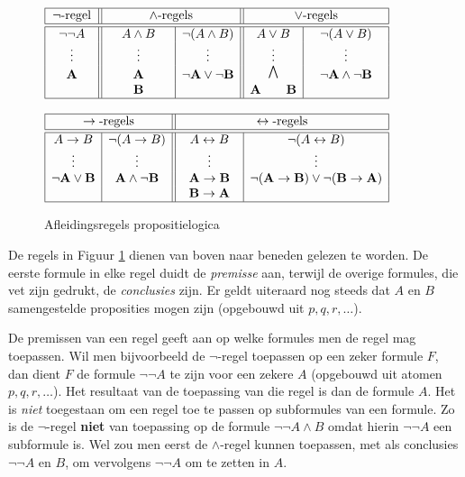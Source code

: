 \begin{figure}[ht]
$\begin{array}{|c||c|c||c|c|}
\hline
\neg\text{-regel} & \multicolumn{2}{c||}{\land\text{-regels}} & \multicolumn{2}{c|}{\lor\text{-regels}} \\
\hline\hline
\neg\neg A & A\land B & \neg(A\land B) & A\lor B & \neg(A\lor B) \\
\vdots & \vdots & \vdots & \vdots & \vdots \\
\mathbf{A} & \mathbf{A} & \mathbf{\neg A\lor\neg B} & \text{\huge $\mathbf{\bigwedge}$} & \mathbf{\neg A\land\neg B} \\
 & \mathbf{B} & & \mathbf{A\qquad B} & \\
 \hline
 \multicolumn{5}{c}{}\\
 \hline
 \multicolumn{2}{|c||}{\rightarrow\text{-regels}} & \multicolumn{3}{c|}{\leftrightarrow\text{-regels}} \\
 \hline\hline
 \multicolumn{1}{|c|}{ A\rightarrow B} & \multicolumn{1}{c||}{\neg(A\rightarrow B)} & \multicolumn{1}{c|}{A\leftrightarrow B} & \multicolumn{2}{c|}{\neg(A\leftrightarrow B)} \\
 \multicolumn{1}{|c|}{\vdots} & \multicolumn{1}{c||}{\vdots} & \multicolumn{1}{c|}{\vdots} & \multicolumn{2}{c|}{\vdots} \\
 \multicolumn{1}{|c|}{\mathbf{\neg A\lor B}} & \multicolumn{1}{c||}{\mathbf{A\land\neg B}} & \multicolumn{1}{c|}{\mathbf{A\rightarrow B}} & \multicolumn{2}{c|}{\mathbf{\neg(A\rightarrow B)\lor\neg(B\rightarrow A)}} \\
 \multicolumn{1}{|c|}{} & \multicolumn{1}{c||}{} & \multicolumn{1}{c|}{\mathbf{B\rightarrow A}} & \multicolumn{2}{c|}{} \\
 \hline
\end{array}$
\caption{Afleidings\-regels propositie\-logica}\label{fig:regels}
\end{figure}

De regels in Figuur \ref{fig:regels} dienen van boven naar beneden gelezen te worden. De eerste formule in elke regel duidt de \textit{premisse} aan, terwijl de overige formules, die vet zijn gedrukt, de \textit{conclusies} zijn. Er geldt uiteraard nog steeds dat $A$ en $B$ samengestelde proposities mogen zijn (opgebouwd uit $p,q,r,\ldots$).

De premissen van een regel geeft aan op welke formules men de regel mag toepassen. Wil men bijvoorbeeld de $\neg$-regel toepassen op een zeker formule $F$, dan dient $F$ de formule $\neg\neg A$ te zijn voor een zekere $A$ (opgebouwd uit atomen $p, q, r, \ldots$). Het resultaat van de toepassing van die regel is dan de formule $A$. Het is \textit{niet} toegestaan om een regel toe te passen op subformules van een formule. Zo is de $\neg$-regel \textbf{niet} van toepassing op de formule $\neg\neg A\land B$ omdat hierin $\neg\neg A$ een subformule is. Wel zou men eerst de $\land$-regel kunnen toepassen, met als conclusies $\neg\neg A$ en $B$, om vervolgens $\neg\neg A$ om te zetten in $A$.

